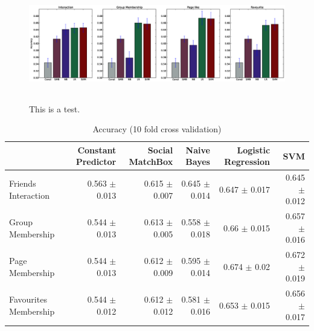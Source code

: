 \documentclass[letterpaper]{article}
\begin{document}
\begin{figure}
	\centering
  	\includegraphics[width= 200mm, height=50mm]{data/accuracy.eps}
	\caption{This is a test.}
\end{figure}

\begin{table}
	\centering
	\footnotesize
  	 \begin{tabular}{| >{\small}l| >{\small}r |>{\small}r | >{\small}r |>{\small}r | >{\small}r  | } 
	\hline
	&Constant Predictor & Social MatchBox & Naive Bayes & Logistic Regression & SVM \\
	\hline
	Friends Interaction & 0.563 $\pm$ 0.013 & 0.615 $\pm$ 0.007 & 0.645 $\pm$ 0.014 & 0.647 $\pm$ 0.017 & 0.645 $\pm$ 0.012\\
	\hline
	Group Membership & 0.544 $\pm$ 0.013 & 0.613 $\pm$ 0.005 & 0.558 $\pm$ 0.018 & 0.66 $\pm$ 0.015 & 0.657 $\pm$ 0.016\\
	\hline
	Page Membership & 0.544 $\pm$ 0.013 & 0.612 $\pm$ 0.009 & 0.595 $\pm$ 0.014 & 0.674 $\pm$ 0.02 & 0.672 $\pm$ 0.019\\
	\hline
	Favourites Membership & 0.544 $\pm$ 0.012 & 0.612 $\pm$ 0.012 & 0.581 $\pm$ 0.016& 0.653 $\pm$ 0.015& 0.656 $\pm$ 0.017\\
	\hline
    \end{tabular}
   \caption{Accuracy (10 fold cross validation) }
\end{table}
\end{document}
